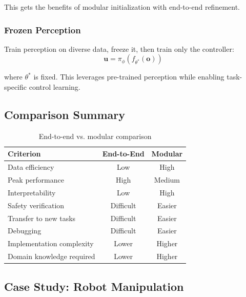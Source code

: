 This gets the benefits of modular initialization with end-to-end refinement.

\subsubsection{Frozen Perception}

Train perception on diverse data, freeze it, then train only the controller:
\begin{equation}
\mathbf{u} = \pi_\phi(f_{\theta^*}(\mathbf{o}))
\label{eq:frozen_perception}
\end{equation}

where $\theta^*$ is fixed. This leverages pre-trained perception while enabling task-specific control learning.

\subsection{Comparison Summary}

\begin{table}[htbp]
\centering
\caption{End-to-end vs. modular comparison}
\label{tab:e2e_vs_modular}
\begin{tabular}{lcc}
\toprule
\textbf{Criterion} & \textbf{End-to-End} & \textbf{Modular} \\
\midrule
Data efficiency & Low & High \\
Peak performance & High & Medium \\
Interpretability & Low & High \\
Safety verification & Difficult & Easier \\
Transfer to new tasks & Difficult & Easier \\
Debugging & Difficult & Easier \\
Implementation complexity & Lower & Higher \\
Domain knowledge required & Lower & Higher \\
\bottomrule
\end{tabular}
\end{table}


\subsection{Case Study: Robot Manipulation}

